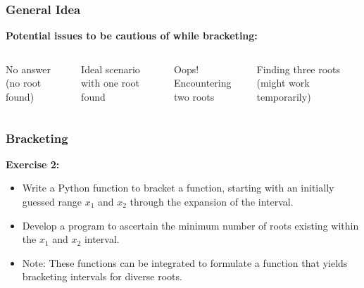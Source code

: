   \begin{frame}[fragile]
    \frametitle{General Idea}
    
    \textbf{Potential issues to be cautious of while bracketing:}
    \begin{columns}
      \vspace{0.01cm}
      \newline 
      No answer (no root found)
      \vspace{0.8cm}
      
      \vspace{0.01cm}
      \newline 
      Ideal scenario with one root found
      \vspace{0.8cm}
      
      \vspace{0.01cm}
      \newline 
      Oops! Encountering two roots
      \vspace{0.8cm}
      
      \vspace{0.01cm}
      \newline 
      Finding three roots (might work temporarily)
      \vspace{0.8cm}
    \end{columns}
  
  \end{frame}

  \begin{frame}[fragile]
    \frametitle{Bracketing}
  
    \textbf{Exercise 2:}
    \begin{itemize}
      \item Write a Python function to bracket a function, starting with an initially guessed range \(x_1\) and \(x_2\) through the expansion of the interval.
      \item Develop a program to ascertain the minimum number of roots existing within the \(x_1\) and \(x_2\) interval.
      \item Note: These functions can be integrated to formulate a function that yields bracketing intervals for diverse roots.
    \end{itemize}
  \end{frame}
  
